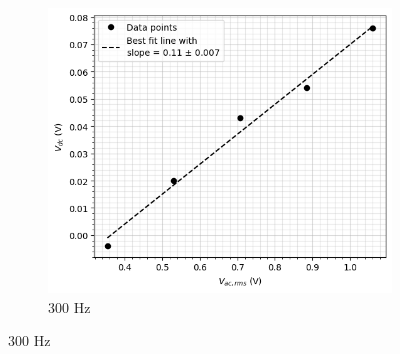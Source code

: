 \begin{figure}[H]
    \begin{subfigure}{\linewidth}
    \includegraphics[width=1\textwidth]{images/c1.png}
    \caption{300 Hz}
    \end{subfigure}
    

\end{figure}
